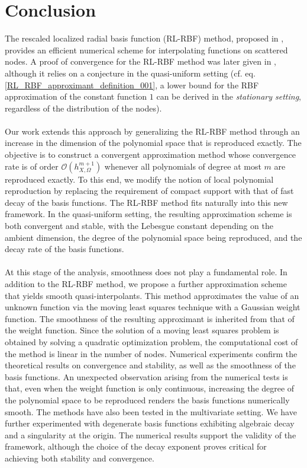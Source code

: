 \documentclass{drna}
\begin{document}
\section{Conclusion}

The rescaled localized radial basis function (RL-RBF) method, proposed in \cite{deparis_2014}, provides an efficient numerical scheme for interpolating functions on scattered nodes. A proof of convergence for the RL-RBF method was later given in \cite{demarchi2020}, although it relies on a conjecture in the quasi-uniform setting (cf. eq. \eqref{RL_RBF_approximant_definition_001}, a lower bound for the RBF approximation of the constant function $1$ can be derived in the \textit{stationary setting}, regardless of the distribution of the nodes).
\\
\\
Our work extends this approach by generalizing the RL-RBF method through an increase in the dimension of the polynomial space that is reproduced exactly. The objective is to construct a convergent approximation method whose convergence rate is of order $\mathcal{O}(h_{X,\Omega}^{m+1})$ whenever all polynomials of degree at most $m$ are reproduced exactly. To this end, we modify the notion of local polynomial reproduction by replacing the requirement of compact support with that of fast decay of the basis functions. The RL-RBF method fits naturally into this new framework. %
In the quasi-uniform setting, the resulting approximation scheme is both convergent and stable, with the Lebesgue constant depending on the ambient dimension, the degree of the polynomial space being reproduced, and the decay rate of the basis functions.
\\
\\
At this stage of the analysis, smoothness does not play a fundamental role. In addition to the RL-RBF method, we propose a further approximation scheme that yields smooth quasi-interpolants. This method approximates the value of an unknown function via the moving least squares technique with a Gaussian weight function. The smoothness of the resulting approximant is inherited from that of the weight function. Since the solution of a moving least squares problem is obtained by solving a quadratic optimization problem, the computational cost of the method is linear in the number of nodes. Numerical experiments confirm the theoretical results on convergence and stability, as well as the smoothness of the basis functions. An unexpected observation arising from the numerical tests is that, even when the weight function is only continuous, increasing the degree of the polynomial space to be reproduced renders the basis functions numerically smooth. 
The methods have also been tested in the multivariate setting. We have further experimented with degenerate basis functions exhibiting algebraic decay and a singularity at the origin. The numerical results support the validity of the framework, although the choice of the decay exponent proves critical for achieving both stability and convergence.
\end{document}
